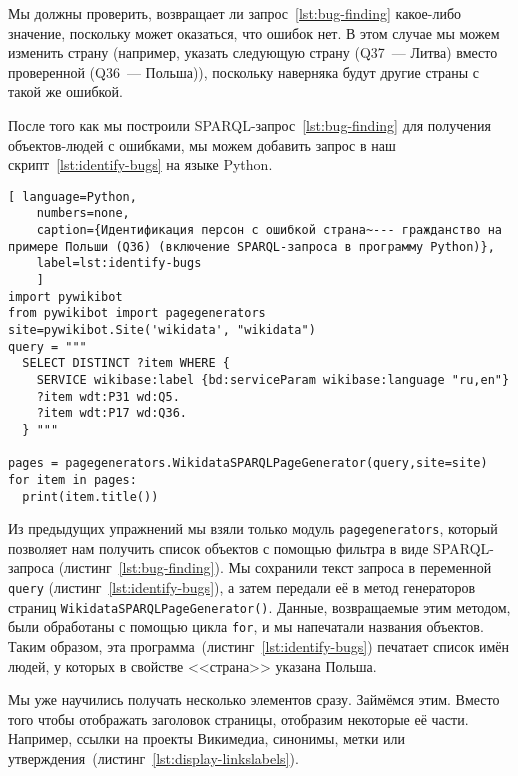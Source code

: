Мы должны проверить, возвращает ли запрос~\ref{lst:bug-finding} какое-либо значение, 
поскольку может оказаться, что ошибок нет. 
В этом случае мы можем изменить страну 
(например, указать следующую страну (Q37~--- Литва) вместо проверенной (Q36~--- Польша)), 
поскольку наверняка будут другие страны с такой же ошибкой.

После того как мы построили SPARQL-запрос~\ref{lst:bug-finding} для получения объектов-людей с ошибками, 
мы можем добавить запрос в наш скрипт~\ref{lst:identify-bugs} на языке Python.

\begin{lstlisting}[ language=Python,
    numbers=none,
    caption={Идентификация персон с ошибкой страна~--- гражданство на примере Польши (Q36) (включение SPARQL-запроса в программу Python)},
    label=lst:identify-bugs
    ]
import pywikibot
from pywikibot import pagegenerators
site=pywikibot.Site('wikidata', "wikidata")
query = """
  SELECT DISTINCT ?item WHERE {
    SERVICE wikibase:label {bd:serviceParam wikibase:language "ru,en"}
    ?item wdt:P31 wd:Q5.
    ?item wdt:P17 wd:Q36.
  } """

pages = pagegenerators.WikidataSPARQLPageGenerator(query,site=site)
for item in pages:
  print(item.title())
\end{lstlisting}    

Из предыдущих упражнений мы взяли только модуль \lstinline|pagegenerators|, 
который позволяет нам получить список объектов с помощью фильтра в виде SPARQL-запроса 
(листинг~\ref{lst:bug-finding}). 
Мы сохранили текст запроса в переменной \lstinline|query| (листинг~\ref{lst:identify-bugs}), 
а затем передали её в метод генераторов страниц \lstinline|WikidataSPARQLPageGenerator()|. 
Данные, возвращаемые этим методом, были обработаны с помощью цикла \lstinline|for|, 
и мы напечатали названия объектов.
Таким образом, эта программа~(листинг~\ref{lst:identify-bugs}) печатает список имён людей, у которых в свойстве <<страна>> указана Польша.

Мы уже научились получать несколько элементов сразу. Займёмся этим. 
Вместо того чтобы отображать заголовок страницы, отобразим некоторые её части. 
Например, ссылки на проекты Викимедиа, синонимы, метки или утверждения~(листинг~\ref{lst:display-linkslabels}).



